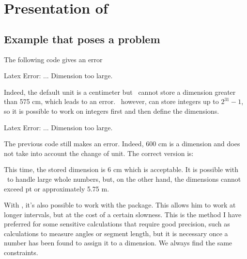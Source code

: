 \section{Presentation of }

\subsection{Example that poses a problem  }

The following code gives an error

\begin{tkzltxexample}[right margin=7cm,small]
\end{tkzltxexample}
 {\color{red} Latex Error: ... Dimension too large.}

Indeed, the default unit is a centimeter but \TEX\ cannot store a dimension
greater than 575 cm, which leads to an error. \TEX\ however, can store integers
up to $2^{31}-1$, so it is possible to work on integers first and then define
the dimensions.

\begin{tkzltxexample}[right margin=7cm,small]
\end{tkzltxexample}

{\color{red} Latex Error: ... Dimension too large.}

The previous code still makes an error. Indeed, 600 cm is a dimension
and does not take into account the change of unit. The correct version is:

\begin{tkzltxexample}[right margin=7cm,small]
\end{tkzltxexample}

This time, the stored dimension is $6$ cm which is acceptable. It is possible with
\TEX\ to handle large whole numbers, but, on the other hand, the dimensions
cannot exceed  pt or approximately 5.75 m.

With \TEX, it's also possible to work with the  package. This
allows him to work at longer intervals, but at the cost of a certain slowness.
This is the method I have preferred for some sensitive calculations that require
good precision, such as calculations to measure angles or segment length, but it
is necessary once a number has been found to assign it to a dimension. We always
find the same constraints.

